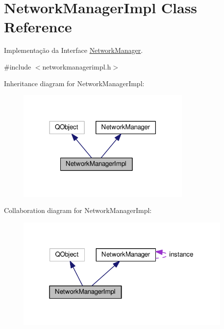 \hypertarget{classNetworkManagerImpl}{}\section{Network\+Manager\+Impl Class Reference}
\label{classNetworkManagerImpl}


Implementação da Interface \hyperlink{classNetworkManager}{Network\+Manager}.  




{\ttfamily \#include $<$networkmanagerimpl.\+h$>$}



Inheritance diagram for Network\+Manager\+Impl\+:
\nopagebreak
\begin{figure}[H]
\begin{center}
\leavevmode
\includegraphics[width=242pt]{d8/dbf/classNetworkManagerImpl__inherit__graph}
\end{center}
\end{figure}


Collaboration diagram for Network\+Manager\+Impl\+:
\nopagebreak
\begin{figure}[H]
\begin{center}
\leavevmode
\includegraphics[width=301pt]{d2/d03/classNetworkManagerImpl__coll__graph}
\end{center}
\end{figure}
